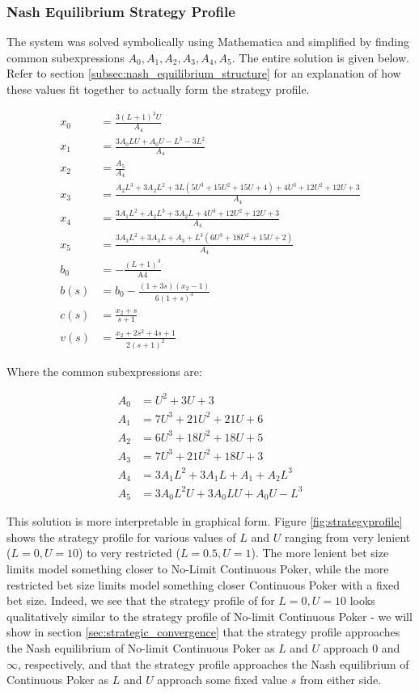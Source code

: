 \documentclass[a4paper,12pt]{article}
\theoremstyle{plain}
\theoremstyle{definition}
\begin{document}
\subsubsection{Nash Equilibrium Strategy Profile}

The system was solved symbolically using Mathematica and simplified by finding common subexpressions $A_0, A_1, A_2, A_3, A_4, A_5$. The entire solution is given below. Refer to section \ref{subsec:nash_equilibrium_structure} for an explanation of how these values fit together to actually form the strategy profile.

\begin{align*}
    x_0 &= \frac{3 (L+1)^3 U}{A_4}\\
    x_1 &= \frac{3 A_0 L U+A_0 U-L^3-3 L^2}{A_4}\\
    x_2 &= \frac{A_5}{A_4}\\
    x_3 &= \frac{A_2 L^3+3 A_2 L^2+3 L \left(5 U^3+15 U^2+15 U+4\right)+4 U^3+12 U^2+12 U+3}{A_4}\\
    x_4 &= \frac{3 A_1 L^2+A_2 L^3+3 A_2 L+4 U^3+12 U^2+12 U+3}{A_4}\\
    x_5 &= \frac{3 A_3 L^2+3 A_3 L+A_3+L^3 \left(6 U^3+18 U^2+15 U+2\right)}{A_4}\\
    b_0 &= -\frac{(L+1)^3}{\text{A4}} \\ 
    b(s) &= b_0 - \frac{(1+3s)(x_2-1)}{6(1+s)^3}\\
    c(s) &= \frac{x_2+s}{s+1}\\
    v(s) &= \frac{x_2+2 s^2+4 s+1}{2 (s+1)^2}
\end{align*}

Where the common subexpressions are:

\begin{align*}
	A_0 &= U^2+3 U+3 \\
    A_1 &= 7 U^3+21 U^2+21 U+6 \\
    A_2 &= 6 U^3+18 U^2+18 U+5 \\
    A_3 &= 7 U^3+21 U^2+18 U+3 \\
    A_4 &= 3 A_1 L^2+3 A_1 L+A_1+A_2 L^3 \\
    A_5 &= 3 A_0 L^2 U+3 A_0 L U+A_0 U-L^3
\end{align*}

This solution is more interpretable in graphical form. Figure \ref{fig:strategyprofile} shows the strategy profile for various values of $L$ and $U$ ranging from very lenient ($L=0, U=10$) to very restricted ($L=0.5, U=1$). The more lenient bet size limits model something closer to No-Limit Continuous Poker, while the more restricted bet size limits model something closer Continuous Poker with a fixed bet size. Indeed, we see that the strategy profile of for $L=0, U=10$ looks qualitatively similar to the strategy profile of No-limit Continuous Poker - we will show in section \ref{sec:strategic_convergence} that the strategy profile approaches the Nash equilibrium of No-limit Continuous Poker as $L$ and $U$ approach $0$ and $\infty$, respectively, and that the strategy profile approaches the Nash equilibrium of Continuous Poker as $L$ and $U$ approach some fixed value $s$ from either side.
\end{document}
